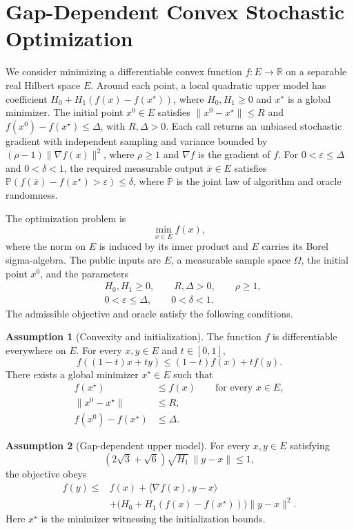 \documentclass[10pt]{article}
\theoremstyle{definition}
\newtheorem{assumption}{Assumption}
\begin{document}
\section*{Gap-Dependent Convex Stochastic Optimization}
We consider minimizing a differentiable convex function $f:E\to\mathbb{R}$ on a separable real Hilbert space $E$. Around each point, a local quadratic upper model has coefficient $H_0+H_1(f(x)-f(x^\star))$, where $H_0,H_1\geq0$ and $x^\star$ is a global minimizer. The initial point $x^0\in E$ satisfies $\|x^0-x^\star\|\leq R$ and $f(x^0)-f(x^\star)\leq\Delta$, with $R,\Delta>0$. Each call returns an unbiased stochastic gradient with independent sampling and variance bounded by $(\rho-1)\|\nabla f(x)\|^2$, where $\rho\geq1$ and $\nabla f$ is the gradient of $f$. For $0<\varepsilon\leq\Delta$ and $0<\delta<1$, the required measurable output $\bar{x}\in E$ satisfies $\mathbb{P}(f(\bar{x})-f(x^\star)>\varepsilon)\leq\delta$, where $\mathbb{P}$ is the joint law of algorithm and oracle randomness.

The optimization problem is
\[
\min_{x\in E} f(x),
\]
where the norm on $E$ is induced by its inner product and $E$ carries its Borel sigma-algebra. The public inputs are $E$, a measurable sample space $\Omega$, the initial point $x^0$, and the parameters
\[
\begin{aligned}
&H_0,H_1\geq0,\qquad R,\Delta>0,\qquad \rho\geq1,\\
&0<\varepsilon\leq\Delta,\qquad 0<\delta<1.
\end{aligned}
\]
The admissible objective and oracle satisfy the following conditions.

\begin{assumption}[Convexity and initialization]
The function $f$ is differentiable everywhere on $E$. For every $x,y\in E$ and $t\in[0,1]$,
\[
f((1-t)x+ty)\leq(1-t)f(x)+tf(y).
\]
There exists a global minimizer $x^\star\in E$ such that
\[
\begin{aligned}
f(x^\star)&\leq f(x)\qquad\text{for every }x\in E,\\
\|x^0-x^\star\|&\leq R,\\
f(x^0)-f(x^\star)&\leq\Delta.
\end{aligned}
\]
\end{assumption}

\begin{assumption}[Gap-dependent upper model]
For every $x,y\in E$ satisfying
\[
(2\sqrt{3}+\sqrt{6})\sqrt{H_1}\,\|y-x\|\leq1,
\]
the objective obeys
\[
\begin{aligned}
f(y)\leq{}&f(x)+\langle\nabla f(x),y-x\rangle\\
&+\bigl(H_0+H_1(f(x)-f(x^\star))\bigr)\|y-x\|^2.
\end{aligned}
\]
Here $x^\star$ is the minimizer witnessing the initialization bounds.
\end{assumption}
\end{document}
